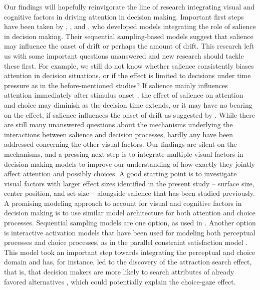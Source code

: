 Our findings will hopefully reinvigorate the line of research integrating visual and cognitive factors in driving attention in decision making. Important first steps have been taken by \cite{chen2013}, \cite{navalpakkam2010}, and \cite{towal2013a}, who developed models integrating the role of salience in decision making. Their sequential sampling-based models suggest that salience may influence the onset of drift or perhaps the amount of drift. This research left us with some important questions unanswered and new research should tackle these first. For example, we still do not know whether salience consistently biases attention in decision situations, or if the effect is limited to decisions under time pressure as in the before-mentioned studies? If salience mainly influences attention immediately after stimulus onset \citep{theeuwes2010, orquin2015a}, the effect of salience on attention and choice may diminish as the decision time extends, or it may have no bearing on the effect, if salience influences the onset of drift as suggested by \cite{chen2013}. While there are still many unanswered questions about the mechanisms underlying the interactions between salience and decision processes, hardly any have been addressed concerning the other visual factors. Our findings are silent on the mechanisms, and a pressing next step is to integrate multiple visual factors in decision making models to improve our understanding of how exactly they jointly affect attention and possibly choices. A good starting point is to investigate visual factors with larger effect sizes identified in the present study -- surface size, center position, and set size -- alongside salience that has been studied previously. A promising modeling approach to account for visual and cognitive factors in decision making is to use similar model architecture for both attention and choice processes. Sequential sampling models are one option, as used in \cite{towal2013a}. Another option is interactive activation models that have been used for modeling both perceptual processes \citep{mcclelland1981} and choice processes, as in the parallel constraint satisfaction model \citep{gloeckner2011a}. This model took an important step towards integrating the perceptual and choice domain and has, for instance, led to the discovery of the attraction search effect, that is, that decision makers are more likely to search attributes of already favored alternatives \citep{jekel2018}, which could potentially explain the choice-gaze effect.

